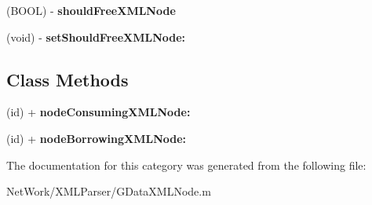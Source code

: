\begin{DoxyCompactItemize}
\item 
\hypertarget{category_g_data_x_m_l_node_07_private_methods_08_a7d6b77d179a4a83b5cfe0c173baf1c3c}{(B\+O\+O\+L) -\/ {\bfseries should\+Free\+X\+M\+L\+Node}}\label{category_g_data_x_m_l_node_07_private_methods_08_a7d6b77d179a4a83b5cfe0c173baf1c3c}

\item 
\hypertarget{category_g_data_x_m_l_node_07_private_methods_08_a0faeb14e174431b0f7b6e90e5bb14e21}{(void) -\/ {\bfseries set\+Should\+Free\+X\+M\+L\+Node\+:}}\label{category_g_data_x_m_l_node_07_private_methods_08_a0faeb14e174431b0f7b6e90e5bb14e21}

\end{DoxyCompactItemize}
\subsection*{Class Methods}
\begin{DoxyCompactItemize}
\item 
\hypertarget{category_g_data_x_m_l_node_07_private_methods_08_afa291e610c39be001971719e6eb37996}{(id) + {\bfseries node\+Consuming\+X\+M\+L\+Node\+:}}\label{category_g_data_x_m_l_node_07_private_methods_08_afa291e610c39be001971719e6eb37996}

\item 
\hypertarget{category_g_data_x_m_l_node_07_private_methods_08_a0b67aacd8d9351afa5d159b3971b932f}{(id) + {\bfseries node\+Borrowing\+X\+M\+L\+Node\+:}}\label{category_g_data_x_m_l_node_07_private_methods_08_a0b67aacd8d9351afa5d159b3971b932f}

\end{DoxyCompactItemize}


The documentation for this category was generated from the following file\+:\begin{DoxyCompactItemize}
\item 
Net\+Work/\+X\+M\+L\+Parser/G\+Data\+X\+M\+L\+Node.\+m\end{DoxyCompactItemize}
